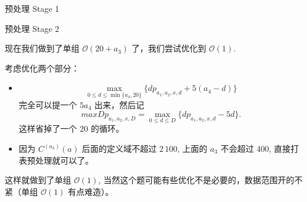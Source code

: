 \documentclass{beamer}
\begin{document}
{\begin{frame}{预处理 Stage 1}
\end{frame}

\begin{frame}{预处理 Stage 2}

现在我们做到了单组 $\mathcal{O}(20 + a_3)$ 了，我们尝试优化到 $\mathcal{O}(1)$.

考虑优化两个部分：

\begin{itemize}
  \item \[\max_{0 \le d \le \min\{a_4, 20\}}\{dp_{a_1, a_2, x, d} + 5(a_4 - d)\}\] 完全可以提一个 $5a_4$ 出来，然后记\[
    maxDp_{a_1, a_2, x, D} = \max_{0 \le d \le D}\{dp_{a_1, a_2, x, d}  - 5d \}.
  \]
  这样省掉了一个 $20$ 的循环。
  \item 因为 $C^{(a_3)}(a)$ 后面的定义域不超过 $2\,100$, 上面的 $a_3$ 不会超过 $400$, 直接打表预处理就可以了。
\end{itemize}

这样就做到了单组 $\mathcal{O}(1)$, 当然这个题可能有些优化不是必要的，数据范围开的不紧（单组 $\mathcal{O}(1)$ 有点难造）。

\end{frame}


}
\end{document}
